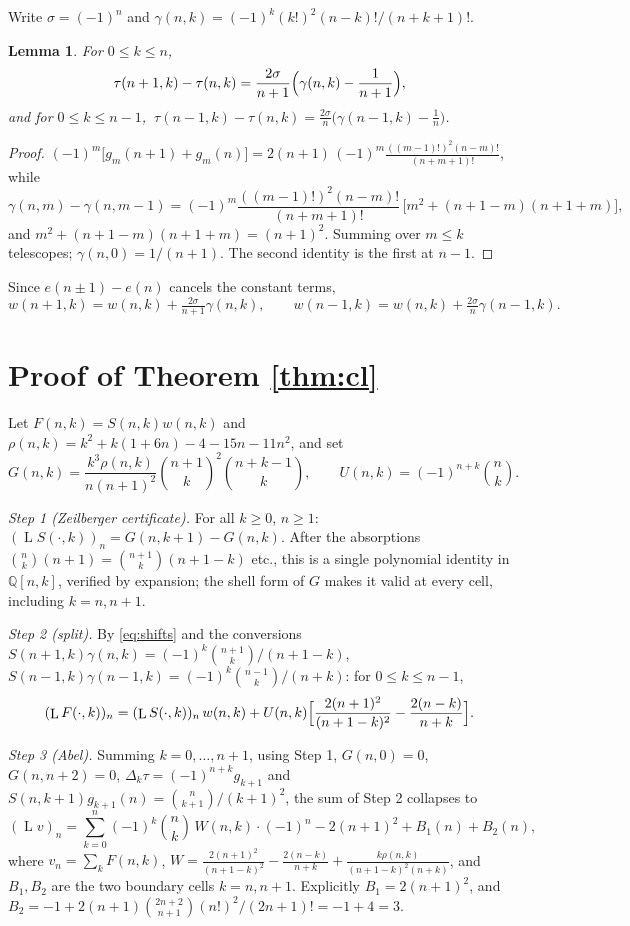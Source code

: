 \documentclass[11pt]{article}
\newtheorem{lemma}{Lemma}
\theoremstyle{remark}
\newcommand{\QQ}{\mathbb{Q}}
\DeclareMathOperator{\Lop}{L}
\begin{document}
Write $\sigma=(-1)^{n}$ and
$\gamma(n,k)=(-1)^{k}(k!)^{2}(n-k)!/(n+k+1)!$.

\begin{lemma}\label{lem:miracle}
For $0\le k\le n$,
\[
\tau(n+1,k)-\tau(n,k)=\frac{2\sigma}{n+1}\Bigl(\gamma(n,k)-\frac1{n+1}\Bigr),
\]
and for $0\le k\le n-1$,
$\ \tau(n-1,k)-\tau(n,k)=\frac{2\sigma}{n}\bigl(\gamma(n-1,k)-\frac1n\bigr)$.
\end{lemma}

\begin{proof}
$(-1)^{m}\bigl[g_m(n+1)+g_m(n)\bigr]
=2(n+1)\,(-1)^{m}\frac{((m-1)!)^{2}(n-m)!}{(n+m+1)!}$, while
\[
\gamma(n,m)-\gamma(n,m-1)
=(-1)^{m}\frac{((m-1)!)^{2}(n-m)!}{(n+m+1)!}\,
\bigl[m^{2}+(n+1-m)(n+1+m)\bigr],
\]
and $m^{2}+(n+1-m)(n+1+m)=(n+1)^{2}$. Summing over $m\le k$ telescopes;
$\gamma(n,0)=1/(n+1)$. The second identity is the first at $n-1$.
\end{proof}

Since $e(n\pm1)-e(n)$ cancels the constant terms,
\begin{equation}\label{eq:shifts}
w(n+1,k)=w(n,k)+\tfrac{2\sigma}{n+1}\gamma(n,k),\qquad
w(n-1,k)=w(n,k)+\tfrac{2\sigma}{n}\gamma(n-1,k).
\end{equation}

\section{Proof of Theorem \ref{thm:cl}}

Let $F(n,k)=S(n,k)w(n,k)$ and $\rho(n,k)=k^{2}+k(1+6n)-4-15n-11n^{2}$, and set
\[
G(n,k)=\frac{k^{3}\rho(n,k)}{n(n+1)^{2}}\binom{n+1}k^{2}\binom{n+k-1}k,
\qquad
U(n,k)=(-1)^{n+k}\binom nk .
\]

\emph{Step 1 (Zeilberger certificate).} For all $k\ge0$, $n\ge1$:
$(\Lop S(\cdot,k))_n=G(n,k+1)-G(n,k)$. After the absorptions
$\binom nk(n+1)=\binom{n+1}k(n+1-k)$ etc., this is a single polynomial identity
in $\QQ[n,k]$, verified by expansion; the shell form of $G$ makes it valid at
every cell, including $k=n,n+1$.

\emph{Step 2 (split).} By \eqref{eq:shifts} and the conversions
$S(n+1,k)\gamma(n,k)=(-1)^{k}\binom{n+1}k/(n+1-k)$,
$S(n-1,k)\gamma(n-1,k)=(-1)^{k}\binom{n-1}k/(n+k)$: for $0\le k\le n-1$,
\[
(\Lop F(\cdot,k))_n=(\Lop S(\cdot,k))_n\,w(n,k)
+U(n,k)\Bigl[\frac{2(n+1)^{2}}{(n+1-k)^{2}}-\frac{2(n-k)}{n+k}\Bigr].
\]

\emph{Step 3 (Abel).} Summing $k=0,\dots,n+1$, using Step 1, $G(n,0)=0$,
$G(n,n+2)=0$, $\Delta_k\tau=(-1)^{n+k}g_{k+1}$ and
$S(n,k+1)g_{k+1}(n)=\binom n{k+1}/(k+1)^{2}$, the sum of Step 2 collapses to
\[
(\Lop v)_n=\sum_{k=0}^{n}(-1)^{k}\binom nk\,W(n,k)\cdot(-1)^{n}
-2(n+1)^{2}+B_1(n)+B_2(n),
\]
where $v_n=\sum_kF(n,k)$,
$W=\frac{2(n+1)^{2}}{(n+1-k)^{2}}-\frac{2(n-k)}{n+k}
+\frac{k\rho(n,k)}{(n+1-k)^{2}(n+k)}$, and $B_1,B_2$ are the two boundary
cells $k=n,n+1$. Explicitly $B_1=2(n+1)^{2}$, and
$B_2=-1+2(n+1)\binom{2n+2}{n+1}(n!)^{2}/(2n+1)!=-1+4=3$.
\end{document}
